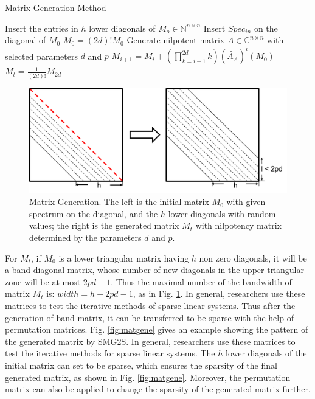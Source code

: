 \begin{algorithm*}[htbp]{}
	\caption{Matrix Generation Method}   
	\label{alg:matgen}   
	\begin{algorithmic}[1]
		\State Insert the entries in $h$ lower diagonals of $M_o \in \mathbb{N}^{n \times n}$
		\State Insert $Spec_{in}$ on the diagonal of $M_0$
		\State $M_0=(2d)!M_0$
		\State Generate nilpotent matrix $A \in \mathbb{C}^{n\times n}$ with selected parameters $d$ and $p$
		\State $M_{i+1}=M_i+(\prod_{k=i+1}^{2d}k)(\widetilde{A_A})^i(M_0)$
		\EndFor 
		\State $M_t = \frac{1}{(2d)!}M_{2d}$
		\EndFunction
	\end{algorithmic}
\end{algorithm*}

\begin{figure}[t]
	\centering
	\includegraphics[width=5.8in]{fig/matgen.pdf}
	\caption{Matrix Generation. The left is the initial matrix $M_0$ with given spectrum on the diagonal, and the $h$ lower diagonals with random values; the right is the generated matrix $M_t$ with nilpotency matrix determined by the parameters $d$ and $p$.}
	\label{fig:matgen}
\end{figure}

For $M_t$, if $M_0$ is a lower triangular matrix having $h$ non zero diagonals, it will be a band diagonal matrix, whose number of new diagonals in the upper triangular zone will be at most $2pd-1$. Thus the maximal number of the bandwidth of matrix $M_t$ is: $width = h + 2pd-1$, as in Fig. \ref{fig:matgen}. In general, researchers use these matrices to test the iterative methods of sparse linear systems. Thus after the generation of band matrix, it can be transferred to be sparse with the help of permutation matrices. Fig. \ref{fig:matgene} gives an example showing the pattern of the generated matrix by SMG2S. In general, researchers use these matrices to test the iterative methods for sparse linear systems. The $h$ lower diagonals of the initial matrix can set to be sparse, which ensures the sparsity of the final generated matrix, as shown in Fig. \ref{fig:matgene}. Moreover, the permutation matrix can also be applied to change the sparsity of the generated matrix further.

